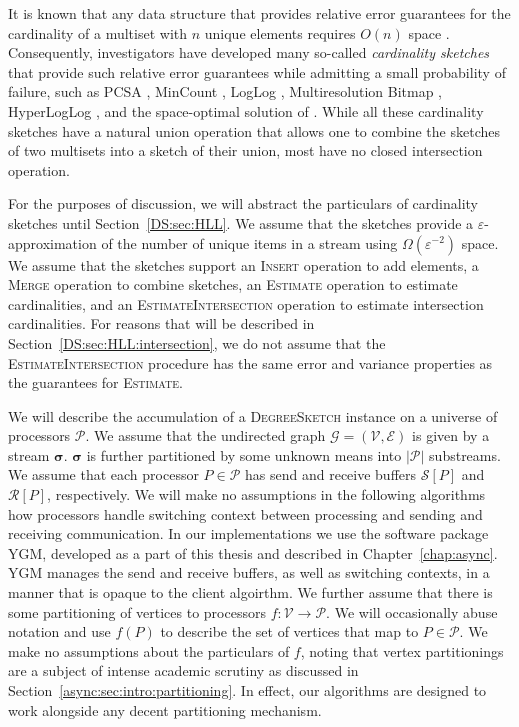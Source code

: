 \documentclass[10]{report}
\newcommand{\algoname}[1]{\textnormal{\textsc{#1}}}
\begin{document}
It is known that any data structure that provides relative error guarantees for the cardinality of a multiset with $n$ unique elements requires $O(n)$ space \cite{alon1999space}.
Consequently, investigators have developed many so-called \emph{cardinality sketches} that provide such relative error guarantees while admitting a small probability of failure, such as PCSA \cite{flajolet1985probabilistic}, MinCount \cite{bar2002counting},  LogLog \cite{durand2003loglog}, Multiresolution Bitmap \cite{estan2003bitmap}, HyperLogLog \cite{flajolet2007hyperloglog}, and the space-optimal solution of \cite{kane2010optimal}.
While all these cardinality sketches have a natural union operation that allows one to combine the sketches of two multisets into a sketch of their union, most have no closed intersection operation.

For the purposes of discussion, we will abstract the particulars of cardinality sketches until Section~\ref{DS:sec:HLL}.
We assume that the sketches provide a $\varepsilon$-approximation of the number of unique items in a stream using $\Omega(\varepsilon^{-2})$ space.
We assume that the sketches support an \algoname{Insert} operation to add elements, a \algoname{Merge} operation to combine sketches, an \algoname{Estimate} operation to estimate cardinalities, and an \algoname{EstimateIntersection} operation to estimate intersection cardinalities.
For reasons that will be described in Section~\ref{DS:sec:HLL:intersection}, we do not assume that the \algoname{EstimateIntersection} procedure has the same error and variance properties as the guarantees for \algoname{Estimate}.

We will describe the accumulation of a \algoname{DegreeSketch} instance on a universe of processors $\mathcal{P}$. 
We assume that the undirected graph $\mathcal{G} = (\mathcal{V}, \mathcal{E})$ is given by a stream $\boldsymbol{\sigma}$.
$\boldsymbol{\sigma}$ is further partitioned by some unknown means into $|\mathcal{P}|$ substreams.
We assume that each processor $P \in \mathcal{P}$ has send and receive buffers $\mathcal{S}[P]$ and $\mathcal{R}[P]$, respectively.
We will make no assumptions in the following algorithms how processors handle switching context between processing and sending and receiving communication. 
In our implementations we use the software package \algoname{YGM}, developed as a part of this thesis and described in Chapter~\ref{chap:async}.
\algoname{YGM} manages the send and receive buffers, as well as switching contexts, in a manner that is opaque to the client algoirthm.
We further assume that there is some partitioning of vertices to processors $f : \mathcal{V} \rightarrow \mathcal{P}$. 
We will occasionally abuse notation and use $f(P)$ to describe the set of vertices that map to $P \in \mathcal{P}$.
We make no assumptions about the particulars of $f$, noting that vertex partitionings are a subject of intense academic scrutiny as discussed in Section~\ref{async:sec:intro:partitioning}.
In effect, our algorithms are designed to work alongside any decent partitioning mechanism. 
\end{document}
